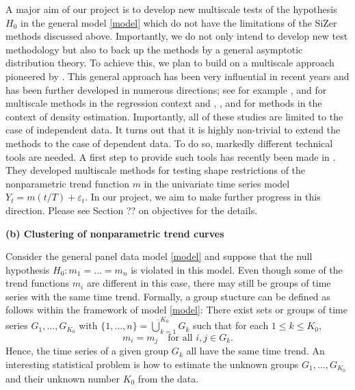 \documentclass[a4paper,12pt]{article}
\begin{document}
A major aim of our project is to develop new multiscale tests of the hypothesis $H_0$ in the general model \eqref{model} which do not have the limitations of the SiZer methods discussed above. Importantly, we do not only intend to develop new test methodology but also to back up the methods by a general asymptotic distribution theory. To achieve this, we plan to build on a multiscale approach pioneered by \cite{DuembgenSpokoiny2001}. This general approach has been very influential in recent years and has been further developed in numerous directions; see for example \cite{Duembgen2002}, \cite{Rohde2008} and \cite{ProkschWernerMunk2018} for multiscale methods in the regression context and \cite{DuembgenWalther2008}, \cite{RufibachWalther2010}, \cite{SchmidtHieber2013} and \cite{EckleBissantzDette2017} for methods in the context of density estimation. Importantly, all of these studies are limited to the case of independent data. It turns out that it is highly non-trivial to extend the methods to the case of dependent data. To do so, markedly different technical tools are needed. A first step to provide such tools has recently been made in \cite{KhismatullinaVogt2018}. They developed multiscale methods for testing shape restrictions of the nonparametric trend function $m$ in the univariate time series model $Y_t = m(t/T) + \varepsilon_t$. In our project, we aim to make further progress in this direction. Please see Section ?? on objectives for the details. 
\vspace{15pt}


\noindent \textbf{(b) Clustering of nonparametric trend curves} 
\vspace{10pt} 


\noindent Consider the general panel data model \eqref{model} and suppose that the null hypothesis $H_0: m_1 = \ldots = m_n$ is violated in this model. Even though some of the trend functions $m_i$ are different in this case, there may still be groups of time series with the same time trend. Formally, a group stucture can be defined as follows within the framework of model \eqref{model}: There exist sets or groups of time series $G_1,\ldots,G_{K_0}$ with $\{1,\ldots,n\} = \dot\bigcup_{k=1}^{K_0} G_k$ such that for each $1 \le k \le K_0$, 
\begin{equation}\label{model-groups}
m_i = m_j \quad \text{for all } i,j \in G_k. 
\end{equation}
Hence, the time series of a given group $G_k$ all have the same time trend. %
An interesting statistical problem is how to estimate the unknown groups $G_1,\ldots,G_{K_0}$ and their unknown number $K_0$ from the data. 
\end{document}
